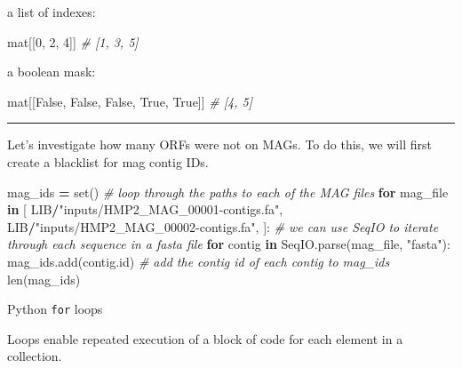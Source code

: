\documentclass[
]{book}
\newenvironment{Shaded}{\begin{snugshade}}{\end{snugshade}}
\newcommand{\BuiltInTok}[1]{#1}
\newcommand{\CommentTok}[1]{\textcolor[rgb]{0.56,0.35,0.01}{\textit{#1}}}
\newcommand{\ControlFlowTok}[1]{\textcolor[rgb]{0.13,0.29,0.53}{\textbf{#1}}}
\newcommand{\DecValTok}[1]{\textcolor[rgb]{0.00,0.00,0.81}{#1}}
\newcommand{\KeywordTok}[1]{\textcolor[rgb]{0.13,0.29,0.53}{\textbf{#1}}}
\newcommand{\NormalTok}[1]{#1}
\newcommand{\OperatorTok}[1]{\textcolor[rgb]{0.81,0.36,0.00}{\textbf{#1}}}
\newcommand{\StringTok}[1]{\textcolor[rgb]{0.31,0.60,0.02}{#1}}
\newcommand{\VariableTok}[1]{\textcolor[rgb]{0.00,0.00,0.00}{#1}}
\begin{document}
a list of indexes:

\begin{Shaded}
\begin{Highlighting}[numbers=left,,]
\NormalTok{mat[[}\DecValTok{0}\NormalTok{, }\DecValTok{2}\NormalTok{, }\DecValTok{4}\NormalTok{]] }\CommentTok{\# [1, 3, 5]}
\end{Highlighting}
\end{Shaded}

a boolean mask:

\begin{Shaded}
\begin{Highlighting}[numbers=left,,]
\NormalTok{mat[[}\VariableTok{False}\NormalTok{, }\VariableTok{False}\NormalTok{, }\VariableTok{False}\NormalTok{, }\VariableTok{True}\NormalTok{, }\VariableTok{True}\NormalTok{]] }\CommentTok{\# [4, 5]}
\end{Highlighting}
\end{Shaded}

\begin{center}\rule{0.5\linewidth}{0.5pt}\end{center}

Let's investigate how many ORFs were not on MAGs. To do this, we will first create a blacklist for mag contig IDs.

\begin{Shaded}
\begin{Highlighting}[numbers=left,,]
\NormalTok{mag\_ids }\OperatorTok{=} \BuiltInTok{set}\NormalTok{()}
\CommentTok{\# loop through the paths to each of the MAG files}
\ControlFlowTok{for}\NormalTok{ mag\_file }\KeywordTok{in}\NormalTok{ [}
\NormalTok{    LIB}\OperatorTok{/}\StringTok{"inputs/HMP2\_MAG\_00001{-}contigs.fa"}\NormalTok{,}
\NormalTok{    LIB}\OperatorTok{/}\StringTok{"inputs/HMP2\_MAG\_00002{-}contigs.fa"}\NormalTok{,}
\NormalTok{]:}
    \CommentTok{\# we can use SeqIO to iterate through each sequence in a fasta file}
    \ControlFlowTok{for}\NormalTok{ contig }\KeywordTok{in}\NormalTok{ SeqIO.parse(mag\_file, }\StringTok{"fasta"}\NormalTok{):}
\NormalTok{        mag\_ids.add(contig.}\BuiltInTok{id}\NormalTok{) }\CommentTok{\# add the contig id of each contig to mag\_ids}
\BuiltInTok{len}\NormalTok{(mag\_ids)}
\end{Highlighting}
\end{Shaded}

Python \texttt{for} loops

Loops enable repeated execution of a block of code for each element in a collection.
\end{document}
